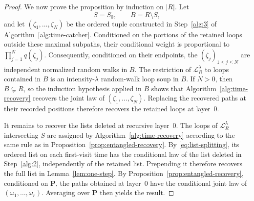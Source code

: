 \documentclass[10pt,a4paper]{amsart}
\newcommand{\Lc}{\mathcal L}
\begin{document}
\begin{proof}
We now prove the proposition by induction on $|R|$.  Let
\[
 S=S_0,\qquad B=R\setminus S,
\]
and let $(\zeta_1,\ldots,\zeta_N)$ be the ordered tuple constructed in
Step~\ref{alg:3} of Algorithm~\ref{alg:time-catcher}.  Conditioned on the
portions of the retained loops outside these maximal subpaths, their
conditional weight is proportional to $\prod_{j=1}^N q(\zeta_j)$.
Consequently, conditioned on their endpoints, the $(\zeta_j)_{1\le j\le N}$ are independent
normalized random walks in $B$.
The restriction of $\Lc_R^\lambda$ to loops contained in $B$ is an
intensity-$\lambda$ random-walk loop soup in $B$. If $N>0$, then
$B\subsetneq R$, so the induction hypothesis applied in $B$ shows that Algorithm~\ref{alg:time-recovery} recovers the joint
law of $(\zeta_1,\ldots,\zeta_N)$.  Replacing the recovered paths at their
recorded positions therefore recovers the retained loops at layer~$0$.


It remains to recover the lists deleted at recursive layer~$0$.  The loops of
$\Lc_R^\lambda$ intersecting $S$ are assigned by
Algorithm~\ref{alg:time-recovery} according to the same rule as in
Proposition~\ref{prop:entangled-recovery}.  By
\eqref{eq:list-splitting}, its ordered list on each first-visit
time has the conditional law of the list deleted in
Step~\ref{alg:2}, independently of the retained list. Prepending it therefore recovers the full list in
Lemma~\ref{lem:one-step}.
By Proposition~\ref{prop:entangled-recovery}, conditioned on
$\boldsymbol P$, the paths obtained at layer~$0$ have the conditional
joint law of $(\omega_1,\ldots,\omega_r)$.  Averaging over
$\boldsymbol P$ then yields the result.
\end{proof}
\end{document}
